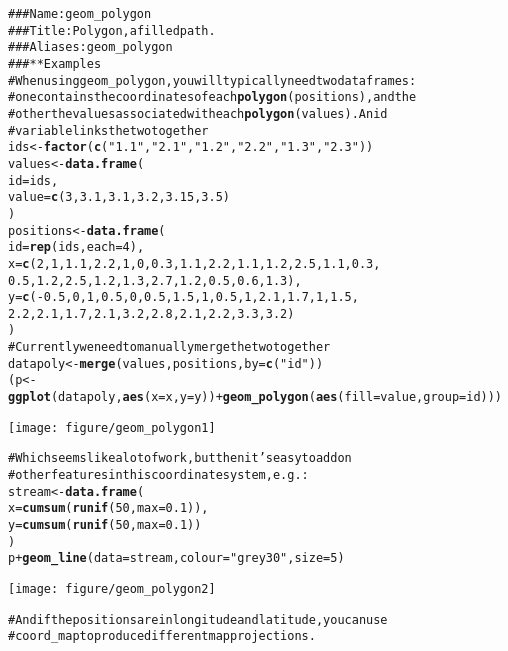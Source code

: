 \documentclass[a4paper,titlepage]{tufte-handout}\usepackage{graphicx, color}
\makeatletter
\def\maxwidth{ %
  \ifdim\Gin@nat@width>\linewidth
    \linewidth
  \else
    \Gin@nat@width
  \fi
}
\newcommand{\hlfunctioncall}[1]{\textcolor[rgb]{0.501960784313725,0,0.329411764705882}{\textbf{#1}}}%
\newcommand{\hlstring}[1]{\textcolor[rgb]{0.6,0.6,1}{#1}}%
\newcommand{\hlcomment}[1]{\textcolor[rgb]{0.180392156862745,0.6,0.341176470588235}{#1}}%
\newenvironment{kframe}{%
 \def\at@end@of@kframe{}%
 \ifinner\ifhmode%
  \def\at@end@of@kframe{\end{minipage}}%
  \begin{minipage}{\columnwidth}%
 \fi\fi%
 \def\FrameCommand##1{\hskip\@totalleftmargin \hskip-\fboxsep
 \colorbox{shadecolor}{##1}\hskip-\fboxsep
     \hskip-\linewidth \hskip-\@totalleftmargin \hskip\columnwidth}%
 \MakeFramed {\advance\hsize-\width
   \@totalleftmargin\z@ \linewidth\hsize
   \@setminipage}}%
 {\par\unskip\endMakeFramed%
 \at@end@of@kframe}
\newenvironment{knitrout}{}{} %
\makeatother
\begin{document}
\begin{knitrout}
\color{fgcolor}\begin{kframe}
\begin{alltt}
\hlcomment{### Name: geom_polygon}
\hlcomment{### Title: Polygon, a filled path.}
\hlcomment{### Aliases: geom_polygon}
\hlcomment{### ** Examples}
\hlcomment{# When using geom_polygon, you will typically need two data frames:}
\hlcomment{# one contains the coordinates of each \hlfunctioncall{polygon} (positions),  and the}
\hlcomment{# other the values associated with each \hlfunctioncall{polygon} (values).  An id}
\hlcomment{# variable links the two together}
ids <- \hlfunctioncall{factor}(\hlfunctioncall{c}(\hlstring{"1.1"}, \hlstring{"2.1"}, \hlstring{"1.2"}, \hlstring{"2.2"}, \hlstring{"1.3"}, \hlstring{"2.3"}))
values <- \hlfunctioncall{data.frame}(
  id = ids,
  value = \hlfunctioncall{c}(3, 3.1, 3.1, 3.2, 3.15, 3.5)
)
positions <- \hlfunctioncall{data.frame}(
  id = \hlfunctioncall{rep}(ids, each = 4),
  x = \hlfunctioncall{c}(2, 1, 1.1, 2.2, 1, 0, 0.3, 1.1, 2.2, 1.1, 1.2, 2.5, 1.1, 0.3,
  0.5, 1.2, 2.5, 1.2, 1.3, 2.7, 1.2, 0.5, 0.6, 1.3),
  y = \hlfunctioncall{c}(-0.5, 0, 1, 0.5, 0, 0.5, 1.5, 1, 0.5, 1, 2.1, 1.7, 1, 1.5,
  2.2, 2.1, 1.7, 2.1, 3.2, 2.8, 2.1, 2.2, 3.3, 3.2)
)
\hlcomment{# Currently we need to manually merge the two together}
datapoly <- \hlfunctioncall{merge}(values, positions, by=\hlfunctioncall{c}(\hlstring{"id"}))
(p <- \hlfunctioncall{ggplot}(datapoly, \hlfunctioncall{aes}(x=x, y=y)) + \hlfunctioncall{geom_polygon}(\hlfunctioncall{aes}(fill=value, group=id)))
\end{alltt}
\end{kframe}\texttt{[image: figure/geom\_polygon1]} \begin{kframe}\begin{alltt}
\hlcomment{# Which seems like a lot of work, but then it's easy to add on}
\hlcomment{# other features in this coordinate system, e.g.:}
stream <- \hlfunctioncall{data.frame}(
  x = \hlfunctioncall{cumsum}(\hlfunctioncall{runif}(50, max = 0.1)),
  y = \hlfunctioncall{cumsum}(\hlfunctioncall{runif}(50,max = 0.1))
)
p + \hlfunctioncall{geom_line}(data = stream, colour=\hlstring{"grey30"}, size = 5)
\end{alltt}
\end{kframe}\texttt{[image: figure/geom\_polygon2]} \begin{kframe}\begin{alltt}
\hlcomment{# And if the positions are in longitude and latitude, you can use}
\hlcomment{# coord_map to produce different map projections.}
\end{alltt}
\end{kframe}
\end{knitrout}
\end{document}
